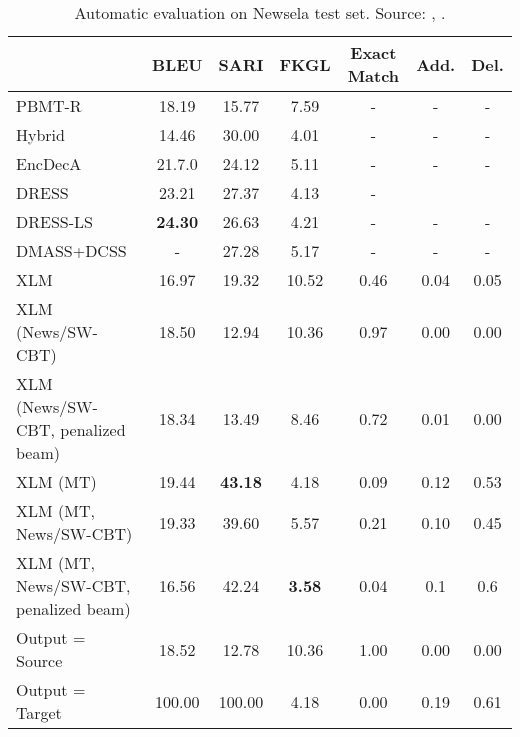 \begin{table}
\centering
\begin{tabular}{m{4.5cm}cccccc}
\hline
\textbf{} & \textbf{BLEU} & \textbf{SARI} & \textbf{FKGL} & \textbf{Exact Match} & \textbf{Add.} & \textbf{Del.} \\
\hline
PBMT-R & 18.19 & 15.77 & 7.59 & - & - & - \\
Hybrid & 14.46 & 30.00 & 4.01 & - & - & - \\
EncDecA & 21.7.0 & 24.12 & 5.11 & - & - & - \\
DRESS & 23.21 & 27.37 & 4.13 & - \\
DRESS-LS & \textbf{24.30} & 26.63 & 4.21 & - & - & - \\
DMASS+DCSS  & - & 27.28 & 5.17 & - & - & - \\
XLM & 16.97 & 19.32 & 10.52 & 0.46 & 0.04 & 0.05 \\
XLM (News/SW-CBT) & 18.50 & 12.94 & 10.36 & 0.97 & 0.00 & 0.00 \\
XLM (News/SW-CBT, penalized beam) & 18.34 & 13.49 & 8.46 & 0.72 & 0.01 & 0.00 \\
XLM (MT) & 19.44 & \textbf{43.18} & 4.18 & 0.09 & 0.12 & 0.53 \\
XLM (MT, News/SW-CBT) & 19.33 & 39.60 & 5.57 & 0.21 & 0.10 & 0.45 \\
XLM (MT, News/SW-CBT, penalized beam) & 16.56 & 42.24 & \textbf{3.58} & 0.04 & 0.1 & 0.6  \\
\hline
Output = Source & 18.52 & 12.78 & 10.36 & 1.00 & 0.00 & 0.00 \\
Output = Target & 100.00 & 100.00 & 4.18 & 0.00 & 0.19 & 0.61 \\
\end{tabular}
\caption{Automatic evaluation on Newsela test set. Source: \cite{zhang-lapata-2017-sentence}, \cite{zhao2018integrating}.}
\label{tab:newsela-results}
\end{table}

